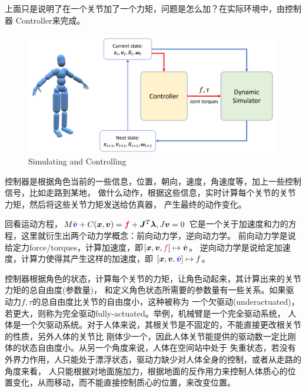 \documentclass[lang=cn,newtx,10pt,scheme=chinese]{elegantbook}
\begin{document}
上面只是说明了在一个关节加了一个力矩，问题是怎么加？在实际环境中，由控制器
Controller来完成。
\begin{figure}[htbp]
  \centering
  \includegraphics[totalheight=2.5in]{"./image/SimulatingControllingCharacter.png"}
  \caption{Simulating and Controlling} \label{fig:SimulatingControlling}
\end{figure}
控制器是根据角色当前的一些信息，位置，朝向，速度，角速度等，加上一些控制信号，比如走路到某地，
做什么动作，根据这些信息，实时计算每个关节的关节力矩，然后将这些关节力矩发送给仿真器，
产生最终的动作变化。

回看运动方程，$M \dot{\textcolor{blue}{\boldsymbol{v}}}+C(\boldsymbol{x}, \boldsymbol{v})  =
\textcolor{red}{\boldsymbol{f}}+\boldsymbol{J}^T \boldsymbol{\lambda}, J \boldsymbol{v} =0$
它是一个关于加速度和力的方程，这里就衍生出两个动力学概念：前向动力学，逆向动力学。
前向动力学是说给定力force/torques，计算加速度，即$[\boldsymbol{x}, \boldsymbol{v}, \textcolor{red}{f}]\mapsto \dot{\boldsymbol{v}}$。
逆向动力学是说给定加速度，计算力使得其产生这样的加速度，即
$[\boldsymbol{x}, \boldsymbol{v}, \textcolor{blue}{\dot{\boldsymbol{v}}}]\mapsto f$。

控制器根据角色的状态，计算每个关节的力矩，让角色动起来，其计算出来的关节力矩的总自由度(参数量)，
和定义角色状态所需要的参数量有一些关系。如果驱动力$f,\tau$的总自由度比关节的自由度小，这种被称为
一个欠驱动(underactuated)，若更大，则称为完全驱动fully-actuated。举例，机械臂是一个完全驱动系统，
人体是一个欠驱动系统。对于人体来说，其根关节是不固定的，不能直接更改根关节的性质，另外人体的关节比
刚体少一个，因此人体关节能提供的驱动数一定比刚体的状态自由度小。从另一个角度来说，人体在空间站中处于
失重状态，若没有外界力作用，人只能处于漂浮状态，驱动力缺少对人体全身的控制，或者从走路的角度来看，
人只能根据对地面施加力，根据地面的反作用力来控制人体质心的位置变化，从而移动，而不能直接控制质心的位置，来改变位置。
\end{document}
